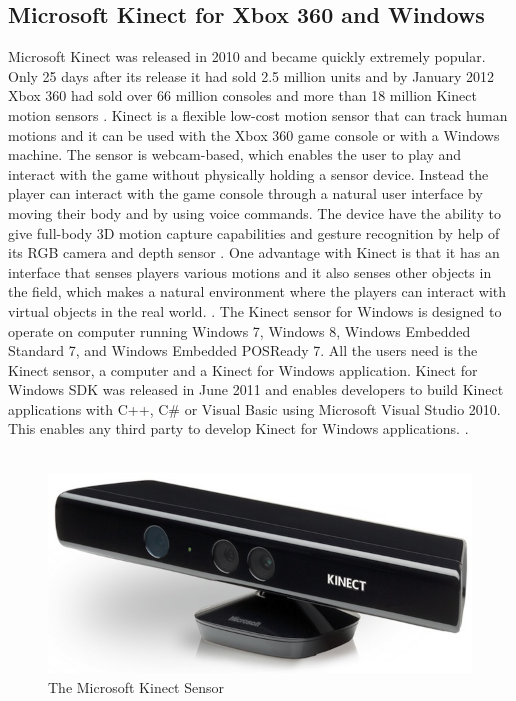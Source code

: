 \subsection{Microsoft Kinect for Xbox 360 and Windows}
Microsoft Kinect was released in 2010 and became quickly extremely popular. Only 25 days after its release it had sold 2.5 million units and by January 2012 Xbox 360 had sold over 66 million consoles and more than 18 million Kinect motion sensors \cite{consoles} \cite{kinectsold}. Kinect is a flexible low-cost motion sensor that can track human motions and it can be used with the Xbox 360 game console or with a Windows machine.  The sensor is webcam-based, which enables the user to play and interact with the game without physically holding a sensor device. Instead the player can interact with the game console through a natural user interface by moving their body and by using voice commands. The device have the ability to give full-body 3D motion capture capabilities and gesture recognition by help of its RGB camera and depth sensor \cite{kinect}. One advantage with Kinect is that it has an interface that senses players various motions and it also senses other objects in the field, which makes a natural environment where the players can interact with virtual objects in the real world. \cite{comparison}. The Kinect sensor for Windows is designed to operate on computer running Windows 7, Windows 8, Windows Embedded Standard 7, and Windows Embedded POSReady 7. All the users need is the Kinect sensor, a computer and a Kinect for Windows application. Kinect for Windows SDK was released in June 2011 and enables developers to build Kinect applications with C++, C\# or Visual Basic using Microsoft Visual Studio 2010. This enables any third party to develop Kinect for Windows applications. \cite{kinectwindows}.\\ \\
\begin{figure}[h!]
\begin{center}
\includegraphics[scale=0.3]{kinect}
\caption[Kinect Sensor]{The Microsoft Kinect Sensor}
\label{fig:KinectSensor}
\end{center}
\end{figure}

